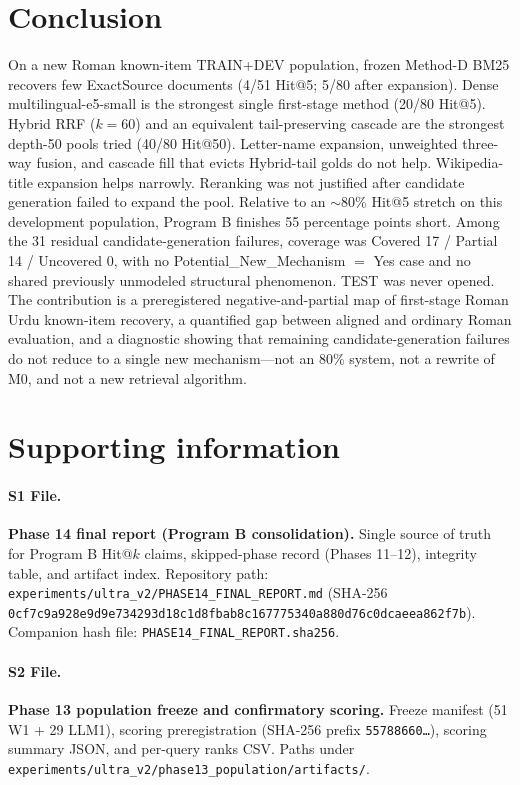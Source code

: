 \documentclass[10pt,letterpaper]{article}
\begin{document}
\section*{Conclusion}
On a new Roman known-item TRAIN+DEV population, frozen Method-D BM25 recovers few ExactSource documents (4/51 Hit@5; 5/80 after expansion). Dense multilingual-e5-small is the strongest single first-stage method (20/80 Hit@5). Hybrid RRF ($k = 60$) and an equivalent tail-preserving cascade are the strongest depth-50 pools tried (40/80 Hit@50). Letter-name expansion, unweighted three-way fusion, and cascade fill that evicts Hybrid-tail golds do not help. Wikipedia-title expansion helps narrowly. Reranking was not justified after candidate generation failed to expand the pool. Relative to an $\sim$80\% Hit@5 stretch on this development population, Program B finishes 55 percentage points short. Among the 31 residual candidate-generation failures, coverage was Covered 17 / Partial 14 / Uncovered 0, with no Potential\_New\_Mechanism $=$ Yes case and no shared previously unmodeled structural phenomenon. TEST was never opened. The contribution is a preregistered negative-and-partial map of first-stage Roman Urdu known-item recovery, a quantified gap between aligned and ordinary Roman evaluation, and a diagnostic showing that remaining candidate-generation failures do not reduce to a single new mechanism---not an 80\% system, not a rewrite of M0, and not a new retrieval algorithm.

\section*{Supporting information}

\paragraph*{S1 File.}
\label{S1_File}
\textbf{Phase 14 final report (Program B consolidation).} Single source of truth for Program B Hit@$k$ claims, skipped-phase record (Phases 11--12), integrity table, and artifact index. Repository path: \texttt{experiments/ultra\_v2/PHASE14\_FINAL\_REPORT.md} (SHA-256 \texttt{0cf7c9a928e9d9e734293d18c1d8fbab8c167775340a880d76c0dcaeea862f7b}). Companion hash file: \texttt{PHASE14\_FINAL\_REPORT.sha256}.

\paragraph*{S2 File.}
\label{S2_File}
\textbf{Phase 13 population freeze and confirmatory scoring.} Freeze manifest (51 W1 + 29 LLM1), scoring preregistration (SHA-256 prefix \texttt{55788660\ldots}), scoring summary JSON, and per-query ranks CSV. Paths under \texttt{experiments/ultra\_v2/phase13\_population/artifacts/}.
\end{document}
